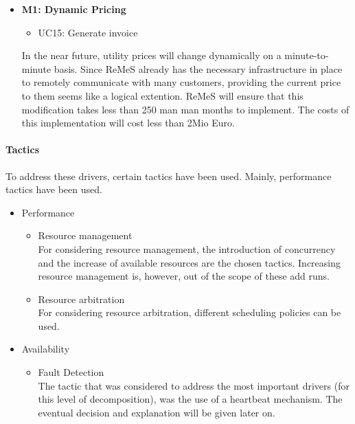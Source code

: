 \begin{itemize}
	\item \textbf{M1: Dynamic Pricing}
	\begin{itemize}
		\item UC15: Generate invoice
	\end{itemize}
	In the near future, utility prices will change dynamically on a minute-to-minute basis.
		Since ReMeS already has the necessary infrastructure in place to remotely communicate with
		many customers, providing the current price to them seems like a logical extention.
		ReMeS will ensure that this modification takes less than 250 man man months to implement.
		The costs of this implementation will cost less than 2Mio Euro.
\end{itemize}


\paragraph{Tactics}
To address these drivers, certain tactics have been used. 
Mainly, performance tactics have been used. 
\begin{itemize}
	\item Performance
	\begin{itemize}
		\item Resource management\\
		For considering resource management, the introduction of concurrency and the increase of available resources are the chosen tactics. Increasing resource management is, however, out of the scope of these add runs.

		\item Resource arbitration\\
		For considering resource arbitration, different scheduling policies can be used.
	\end{itemize}
	\item{Availability}
	\begin{itemize}
		\item Fault Detection\\
		The tactic that was considered to address the most important drivers (for this level of decomposition), was the use of a heartbeat mechanism. 
The eventual decision and explanation will be given later on.
	\end{itemize}
\end{itemize}


